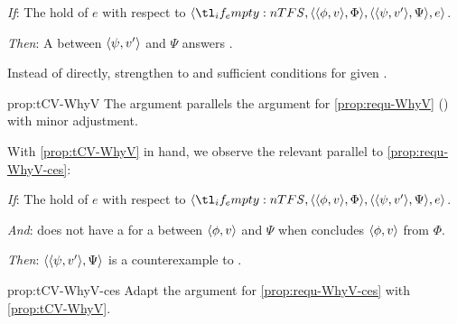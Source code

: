 \begin{note}
  \begin{proposition}
    \label{prop:tCV-WhyV}
    \vspace{-\baselineskip}
    \begin{itenum}
    \item[\emph{If}:]
      The  hold of \(e\) with respect to \(\langle \vAgent{}, \pvp{\phi}{v}{\Phi}, \pvp{\psi}{v'}{\Psi}, e \rangle\).
    \item[\emph{Then}:]
      A \ros{} between \(\langle \psi, v' \rangle\) and \(\Psi\) answers \qWhyV{}.
    \end{itenum}
    \vspace{-1.5\baselineskip}
  \end{proposition}

  Instead of \requ{} directly, strengthen to \tCV{} and sufficient conditions for \requ{} given \tCV{}.

  \begin{argument}{prop:tCV-WhyV}
    The argument parallels the argument for \autoref{prop:requ-WhyV} () with minor adjustment.

  \end{argument}

  \noindent%
  With \autoref{prop:tCV-WhyV} in hand, we observe the relevant parallel to \autoref{prop:requ-WhyV-ces}:

  \begin{proposition}
    \label{prop:tCV-WhyV-ces}
    \vspace{-\baselineskip}
    \begin{itenum}
    \item[\emph{If}:]
      The  hold of \(e\) with respect to \(\langle \vAgent{}, \pvp{\phi}{v}{\Phi}, \pvp{\psi}{v'}{\Psi}, e \rangle\).
    \item[\emph{And}:]
      \vAgent{} does not have a \wit{} for a \ros{} between \(\langle \phi, v \rangle\) and \(\Psi\) when \vAgent{} concludes \(\langle \phi, v \rangle\) from \(\Phi\).
    \item[\emph{Then}:]
      \(\langle \langle \psi, v' \rangle, \Psi \rangle\) is a counterexample to \issueConstraint{}.
    \end{itenum}
    \vspace{-\baselineskip}
  \end{proposition}

  \begin{argument}{prop:tCV-WhyV-ces}
    Adapt the argument for \autoref{prop:requ-WhyV-ces} with \autoref{prop:tCV-WhyV}.
  \end{argument}
\end{note}

